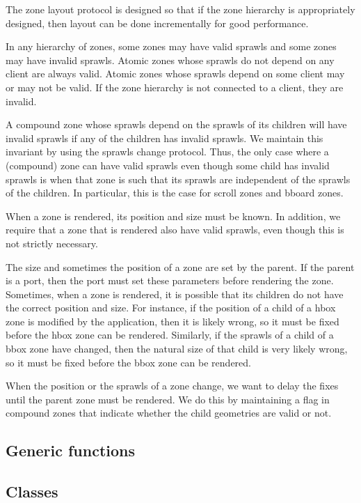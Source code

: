 The zone layout protocol is designed so that if the zone hierarchy is
appropriately designed, then layout can be done incrementally for good
performance. 

In any hierarchy of zones, some zones may have valid sprawls and some
zones may have invalid sprawls.  Atomic zones whose sprawls do not depend
on any client are always valid.  Atomic zones whose sprawls depend on
some client may or may not be valid.  If the zone hierarchy is not
connected to a client, they are invalid. 

A compound zone whose sprawls depend on the sprawls of its children will
have invalid sprawls if any of the children has invalid sprawls.  We
maintain this invariant by using the sprawls change protocol.  Thus, the
only case where a (compound) zone can have valid sprawls even though
some child has invalid sprawls is when that zone is such that its sprawls
are independent of the sprawls of the children.  In particular, this is
the case for scroll zones and bboard zones.

When a zone is rendered, its position and size must be known.  In
addition, we require that a zone that is rendered also have valid
sprawls, even though this is not strictly necessary.

The size and sometimes the position of a zone are set by the parent.
If the parent is a port, then the port must set these parameters
before rendering the zone.  Sometimes, when a zone is rendered, it is
possible that its children do not have the correct position and size.
For instance, if the position of a child of a hbox zone is modified by
the application, then it is likely wrong, so it must be fixed before
the hbox zone can be rendered.  Similarly, if the sprawls of a child of
a bbox zone have changed, then the natural size of that child is very
likely wrong, so it must be fixed before the bbox zone can be
rendered.

When the position or the sprawls of a zone change, we want to delay the
fixes until the parent zone must be rendered.  We do this by
maintaining a flag in compound zones that indicate whether the child
geometries are valid or not.  

\subsection{Generic functions}

\subsection{Classes}

